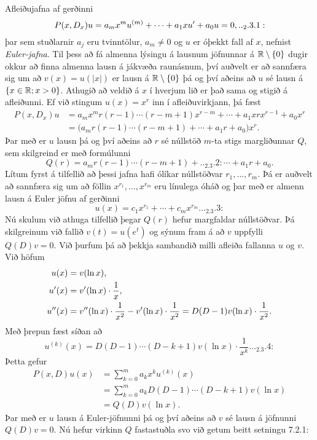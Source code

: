 \noindent
Afleiðujafna af gerðinni
\begin{equation*}
P(x,D_x)u=
a_mx^mu^{(m)}+\cdots+a_1xu\dash+a_0u=0,

.. _2.3.1:

\end{equation*}
þar sem stuðlarnir $a_j$ eru tvinntölur, $a_m\neq 0$ og $u$ er óþekkt
fall af $x$, nefnist {\it Euler-jafna}.  
Til þess að fá almenna lýsingu á lausnum jöfnunnar á ${\mathbb R}\setminus{\{0\}}$
dugir okkur að finna almenna lausn á jákvæða raunásnum, því auðvelt er
að sannfæra sig um að $v(x)=u(|x|)$ er lausn á ${\mathbb R}\setminus{\{0\}}$ þá og
því aðeins að $u$ sé lausn á $\{x\in {\mathbb R}; x>0\}$.
Athugið að veldið á $x$ í
hverjum lið er það sama og stigið á afleiðunni.  Ef við stingum 
$u(x)=x^r$ inn í afleiðuvirkjann, þá fæst
\begin{align*}
P(x,D_x)u
&=a_mx^m r(r-1)\cdots(r-m+1)x^{r-m}
+\cdots+a_1xrx^{r-1}+a_0x^r\\
&=\big(a_m r(r-1)\cdots(r-m+1)+
\cdots+a_1r+a_0\big)x^r.
\end{align*}
Þar með er $u$ lausn þá og því aðeins að $r$ sé núllstöð $m$-ta stigs
margliðunnar $Q$, sem skilgreind er með formúlunni
\begin{equation*}
Q(r)=a_m r(r-1)\cdots(r-m+1)+

.. _2.3.2:

\cdots+a_1r+a_0.
\end{equation*}
Lítum fyrst á tilfellið að þessi jafna hafi ólíkar núllstöðvar
$r_1,\dots, r_m$. 
Þá er auðvelt að sannfæra sig  um að
föllin $x^{r_1},\dots,x^{r_m}$ eru línulega óháð og þar
með er almenn lausn á Euler jöfnu af gerðinni
\begin{equation*}
u(x)=c_1x^{r_1}+\cdots+c_mx^{r_m}.

.. _2.3.3:

\end{equation*}
Nú skulum við athuga tilfellið þegar $Q(r)$ hefur margfaldar
núllstöðvar.  Þá skilgreinum við fallið $v(t)=u(e^t)$ og sýnum fram á að
$v$ uppfylli  $Q(D)v=0$.  Við 
þurfum þá að þekkja sambandið milli afleiða fallanna $u$ og $v$.
Við höfum
\begin{align*}
u(x)&=v(\ln x),\\
u{\sp{\prime}}(x)&=v{\sp{\prime}}(\ln x)\cdot \dfrac 1x,\\
u{\sp{\prime\prime}}(x)&=v{\sp{\prime\prime}}(\ln x)\cdot \dfrac 1{x^2}
-v{\sp{\prime}}(\ln x)\cdot \dfrac 1{x^2} = D(D-1)v(\ln x)\cdot \dfrac 1{x^2}.
\end{align*}
Með þrepun fæst síðan að 
\begin{equation*}
u^{(k)}(x)=D(D-1)\cdots(D-k+1)v(\ln x)\cdot \dfrac 1{x^k}.


.. _2.3.4:

\end{equation*}
Þetta gefur 
\begin{align*}
P(x,D)u(x)&=\sum\limits_{k=0}^m a_kx^ku^{(k)}(x)\\
&=\sum\limits_{k=0}^m a_kD(D-1)\cdots(D-k+1)v(\ln x)\\
&=Q(D)v(\ln x).
\end{align*}
Þar með er $u$ lausn
á Euler-jöfnunni þá og því aðeins að $v$ sé lausn á jöfnunni 
$Q(D)v=0$.  Nú hefur virkinn $Q$ fastastuðla svo við getum beitt 
setningu 7.2.1:

